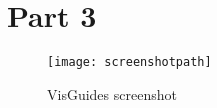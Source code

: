 \hypertarget{part-3}{%
\section{Part 3}\label{part-3}}

\begin{figure}
\centering
\texttt{[image: screenshotpath]}
\caption{VisGuides screenshot}
\end{figure}
